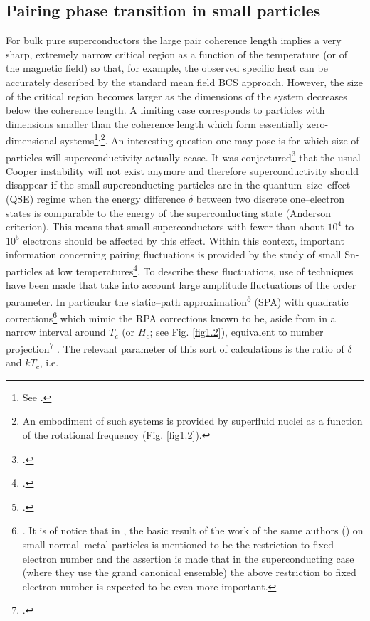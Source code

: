 \begin{subappendices}
  \subsection{Pairing phase transition in small particles}
  For bulk pure superconductors the large pair coherence length implies a very sharp, extremely narrow critical region as a function of the temperature (or of the magnetic field) so that, for example, the observed specific heat can be accurately described by the standard mean field BCS approach. However, the size of the critical region becomes larger as the dimensions of the system decreases below the coherence length. A limiting case corresponds   to particles with dimensions smaller than the coherence length which form essentially zero-dimensional systems\footnote{See \cite{Perenboom:81,Anderson:59,Kubo:62,Kubo:68,Muhlschlegel:72,Lauritzen:93}.}$^{,}$\footnote{An embodiment of such systems is provided by superfluid nuclei as a function of the rotational frequency (Fig. \ref{fig1.2}).}. An interesting question one may pose is for which size of particles will superconductivity actually cease. It was conjectured\footnote{\cite{Anderson:59}.} that the usual Cooper instability will not exist anymore and therefore superconductivity should disappear if the small superconducting particles are in the quantum--size--effect (QSE) regime when the energy difference $\delta$ between two discrete one--electron states is comparable to the energy of the superconducting state (Anderson criterion). This means that small superconductors with fewer than about $10^4$ to $10^5$ electrons should be affected by this effect.
  Within this context, important information concerning pairing fluctuations is provided by the study of small Sn-particles at low temperatures\footnote{\cite{Perenboom:81}.}. To describe these fluctuations, use of techniques have been made that take into account large amplitude fluctuations of the order parameter. In particular the static--path approximation\footnote{\cite{Muhlschlegel:72}.} (SPA) with quadratic corrections\footnote{\cite{Lauritzen:93}. It is of notice that in \cite{Muhlschlegel:72}, the basic result of the work of the same authors (\cite{Denton:71}) on small normal--metal particles is mentioned to be the restriction to fixed electron number and the assertion is made that in the superconducting case (where they use the grand canonical ensemble) the above restriction to fixed electron number is expected to be even more important.} which mimic the RPA corrections known to be, aside from in a narrow interval around $T_c$ (or $H_c$; see Fig. \ref{fig1.2}), equivalent to number projection\footnote{\cite{Shimizu:90}.} . The relevant parameter of this sort of calculations is the ratio of $\delta$ and $kT_c$, i.e.

\end{subappendices}
